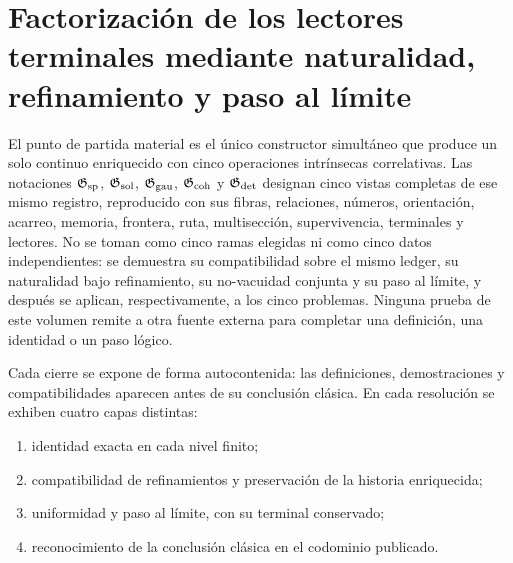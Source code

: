 \section{Factorización de los lectores terminales mediante naturalidad, refinamiento y paso al límite}

El punto de partida material es el único constructor simultáneo que produce un
solo continuo enriquecido con cinco operaciones intrínsecas correlativas. Las
notaciones
\(\mathfrak G_{\rm sp}\), \(\mathfrak G_{\rm sol}\),
\(\mathfrak G_{\rm gau}\), \(\mathfrak G_{\rm coh}\) y
\(\mathfrak G_{\rm det}\) designan cinco vistas completas de ese mismo registro,
reproducido con sus fibras,
relaciones, números, orientación, acarreo, memoria, frontera, ruta, multisección,
supervivencia, terminales y lectores. No se toman como cinco ramas elegidas ni como
cinco datos independientes: se demuestra su compatibilidad sobre el mismo ledger,
su naturalidad bajo refinamiento, su no-vacuidad conjunta y su paso al límite, y
después se aplican, respectivamente, a los cinco problemas. Ninguna prueba de este
volumen remite a otra fuente externa para completar una definición, una identidad o un paso
lógico.

Cada cierre se expone de forma autocontenida: las definiciones, demostraciones y
compatibilidades aparecen antes de su conclusión clásica. En cada resolución
se exhiben cuatro capas distintas:
\begin{enumerate}
  \item identidad exacta en cada nivel finito;
  \item compatibilidad de refinamientos y preservación de la historia enriquecida;
  \item uniformidad y paso al límite, con su terminal conservado;
  \item reconocimiento de la conclusión clásica en el codominio publicado.
\end{enumerate}

